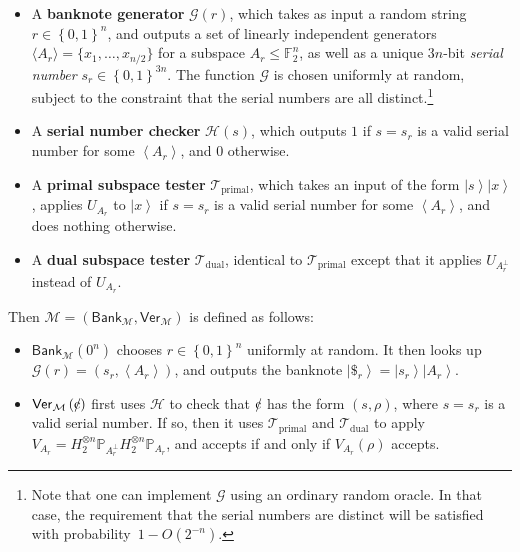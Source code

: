 \begin{itemize}
\item A \textbf{banknote generator} $\mathcal{G}\left(  r\right)  $, which
takes as input a random string $r\in\left\{  0,1\right\}  ^{n}$, and outputs a
set of linearly independent generators $\langle A_{r}\rangle
=\{  x_{1},\ldots,x_{n/2}\}  $ for a subspace $A_{r}\leq
\mathbb{F}_{2}^{n}$, as well as a unique $3n$-bit \emph{serial number}
$s_{r}\in\left\{  0,1\right\}  ^{3n}$. The function $\mathcal{G}$ is chosen
uniformly at random, subject to the constraint that the serial numbers are all
distinct.\footnote{Note that one can implement $\mathcal{G}$ using an
ordinary random oracle. In that case, the requirement that the serial
numbers are distinct will be satisfied with probability\ $1-O\left(
2^{-n}\right)  $.}

\item A \textbf{serial number checker} $\mathcal{H}\left(  s\right)  $, which
outputs $1$ if $s=s_{r}$ is a valid serial number for some $\left\langle
A_{r}\right\rangle $, and $0$ otherwise.

\item A \textbf{primal subspace tester} $\mathcal{T}_{\operatorname*{primal}}%
$, which takes an input of the form $\left\vert s\right\rangle \left\vert
x\right\rangle $, applies $U_{A_{r}}$ to $\left\vert x\right\rangle $ if
$s=s_{r}$ is a valid serial number for some $\left\langle A_{r}\right\rangle
$, and does nothing otherwise.

\item A \textbf{dual subspace tester} $\mathcal{T}_{\operatorname*{dual}}$,
identical to $\mathcal{T}_{\operatorname*{primal}}$ except that it applies
$U_{A_{r}^{\bot}}$ instead of $U_{A_{r}}$.
\end{itemize}

Then $\mathcal{M}=\left(  \mathsf{Bank}_{\mathcal{M}},\mathsf{Ver}%
_{\mathcal{M}}\right)  $ is defined as follows:

\begin{itemize}
\item $\mathsf{Bank}_{\mathcal{M}}\left(  0^{n}\right)  $ chooses
$r\in\left\{  0,1\right\}  ^{n}$ uniformly at random. It then looks up
$\mathcal{G}\left(  r\right)  =\left(  s_{r},\left\langle A_{r}\right\rangle
\right)  $, and outputs the banknote $\left\vert \$_{r}\right\rangle
=\left\vert s_{r}\right\rangle \left\vert A_{r}\right\rangle $.

\item $\mathsf{Ver}_{\mathcal{M}}\left(
%
%
\hbox{\rm\rlap/c}%
%
\right)  $ first uses $\mathcal{H}$ to check that $%
%
%
\hbox{\rm\rlap/c}%
%
$ has the form $\left(  s,\rho\right)  $, where $s=s_{r}$ is a valid serial
number. If so, then it uses $\mathcal{T}_{\operatorname*{primal}}$ and
$\mathcal{T}_{\operatorname*{dual}}$ to apply $V_{A_{r}}=H_{2}^{\otimes
n}\mathbb{P}_{A_{r}^{\bot}}H_{2}^{\otimes n}\mathbb{P}_{A_{r}}$, and accepts
if and only if $V_{A_{r}}\left(  \rho\right)  $ accepts.
\end{itemize}

